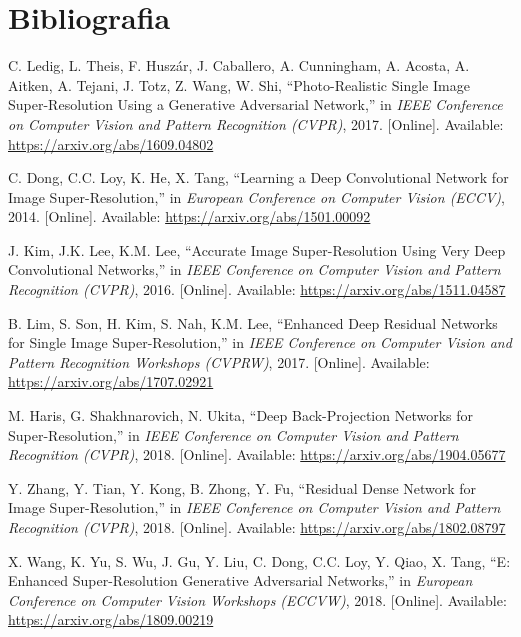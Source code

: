 \documentclass[10pt]{article}
\begin{document}
\section*{Bibliografia}
\begin{thebibliography}{10}

    C. Ledig, L. Theis, F. Huszár, J. Caballero, A. Cunningham, A. Acosta, A. Aitken, A. Tejani, J. Totz, Z. Wang, W. Shi, ``Photo-Realistic Single Image Super-Resolution Using a Generative Adversarial Network,'' in \textit{IEEE Conference on Computer Vision and Pattern Recognition (CVPR)}, 2017. [Online]. Available: \url{https://arxiv.org/abs/1609.04802}
    
    C. Dong, C.C. Loy, K. He, X. Tang, ``Learning a Deep Convolutional Network for Image Super-Resolution,'' in \textit{European Conference on Computer Vision (ECCV)}, 2014. [Online]. Available: \url{https://arxiv.org/abs/1501.00092}
    
    J. Kim, J.K. Lee, K.M. Lee, ``Accurate Image Super-Resolution Using Very Deep Convolutional Networks,'' in \textit{IEEE Conference on Computer Vision and Pattern Recognition (CVPR)}, 2016. [Online]. Available: \url{https://arxiv.org/abs/1511.04587}
    
    B. Lim, S. Son, H. Kim, S. Nah, K.M. Lee, ``Enhanced Deep Residual Networks for Single Image Super-Resolution,'' in \textit{IEEE Conference on Computer Vision and Pattern Recognition Workshops (CVPRW)}, 2017. [Online]. Available: \url{https://arxiv.org/abs/1707.02921}
    
    M. Haris, G. Shakhnarovich, N. Ukita, ``Deep Back-Projection Networks for Super-Resolution,'' in \textit{IEEE Conference on Computer Vision and Pattern Recognition (CVPR)}, 2018. [Online]. Available: \url{https://arxiv.org/abs/1904.05677}
    
    Y. Zhang, Y. Tian, Y. Kong, B. Zhong, Y. Fu, ``Residual Dense Network for Image Super-Resolution,'' in \textit{IEEE Conference on Computer Vision and Pattern Recognition (CVPR)}, 2018. [Online]. Available: \url{https://arxiv.org/abs/1802.08797}
    
    X. Wang, K. Yu, S. Wu, J. Gu, Y. Liu, C. Dong, C.C. Loy, Y. Qiao, X. Tang, ``E: Enhanced Super-Resolution Generative Adversarial Networks,'' in \textit{European Conference on Computer Vision Workshops (ECCVW)}, 2018. [Online]. Available: \url{https://arxiv.org/abs/1809.00219}
    

\end{thebibliography}
\end{document}
